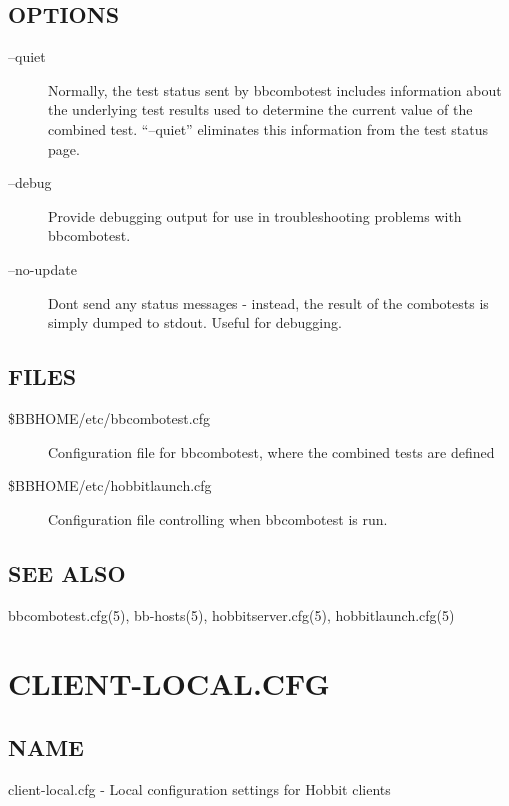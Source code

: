 \subsection{OPTIONS}
\begin{description}
\item[--quiet] Normally, the test status sent by bbcombotest includes
  information about the underlying test results used to determine the
  current value of the combined test. ``--quiet'' eliminates this
  information from the test status page. 


 

\item[--debug] Provide debugging output for use in troubleshooting problems with bbcombotest. 

 

\item[--no-update] Dont send any status messages - instead, the result of the combotests is simply dumped to stdout. Useful for debugging. 


\end{description}
\subsection{FILES}
\begin{description}
\item[\$BBHOME/etc/bbcombotest.cfg] Configuration file for bbcombotest, where the combined tests are defined 
\item[\$BBHOME/etc/hobbitlaunch.cfg] Configuration file controlling when bbcombotest is run. 


\end{description}
\subsection{SEE ALSO}
bbcombotest.cfg(5), bb-hosts(5), hobbitserver.cfg(5), hobbitlaunch.cfg(5) 

%
\newpage
\section{CLIENT-LOCAL.CFG}
\subsection{NAME}
 client-local.cfg - Local configuration settings for Hobbit clients 

